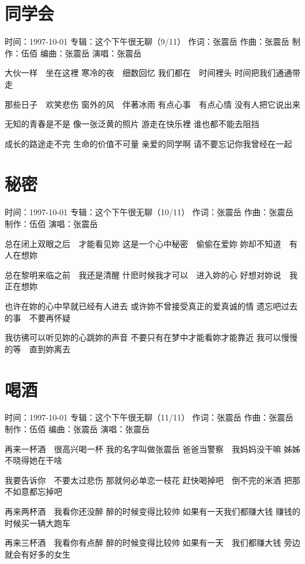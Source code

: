 \documentclass[UTF8,a4paper,oneside,twocolumn,12pt]{ctexbook}
\newcommand{\infopair}[2]{\textbullet #1：#2}
\newcommand{\zc}[1][伍佰]{\infopair{作词}{#1}}
\newcommand{\zq}[1][伍佰]{\infopair{作曲}{#1}}
\newcommand{\bq}[1][伍佰]{\infopair{编曲}{#1}}
\newcommand{\zj}[1]{\infopair{专辑}{#1}}
\newcommand{\zz}[1]{\infopair{制作}{#1}}
\newcommand{\sj}[1]{\infopair{时间}{#1}}
\newenvironment{info}{\begin{flushleft}\kaishu
	}
	{\end{flushleft}\normalsize\yahei\par}
\newenvironment{lyric}{
	}
{}
\begin{document}
\section{同学会}
\begin{info}
	\sj{1997-10-01}
	\zj{这个下午很无聊（9/11）}
	\zc[张震岳]
	\zq[张震岳]
	\zz{伍佰}
	\bq[张震岳]
	\infopair{演唱}{张震岳}
\end{info}
\begin{lyric}
	大伙一样　坐在这裡
	寒冷的夜　细数回忆
	我们都在　时间裡头
	时间把我们通通带走

	那些日子　欢笑悲伤
	窗外的风　伴著冰雨
	有点心事　有点心情
	没有人把它说出来

	无知的青春是不是
	像一张泛黄的照片
	游走在快乐裡
	谁也都不能去阻挡

	成长的路途走不完
	生命的价值不可量
	亲爱的同学啊
	请不要忘记你我曾经在一起
\end{lyric}

\section{秘密}
\begin{info}
	\sj{1997-10-01}
	\zj{这个下午很无聊（10/11）}
	\zc[张震岳]
	\zq[张震岳]
	\zz{伍佰}
	\infopair{演唱}{张震岳}
\end{info}
\begin{lyric}
	总在闭上双眼之后　才能看见妳
	这是一个心中秘密　偷偷在爱妳
	妳却不知道　有人在想妳

	总在黎明来临之前　我还是清醒
	什麽时候我才可以　进入妳的心
	好想对妳说　我正在想妳

	也许在妳的心中早就已经有人进去
	或许妳不曾接受真正的爱真诚的情
	遗忘吧过去的事　不要再怀疑

	我彷彿可以听见妳的心跳妳的声音
	不要只有在梦中才能看妳才能靠近
	我可以慢慢的等　直到妳离去
\end{lyric}

\section{喝酒}
\begin{info}
	\sj{1997-10-01}
	\zj{这个下午很无聊（11/11）}
	\zc[张震岳]
	\zq[张震岳]
	\zz{伍佰}
	\bq[张震岳]
	\infopair{演唱}{张震岳}
\end{info}
\begin{lyric}
	再来一杯酒　很高兴喝一杯
	我的名字叫做张震岳
	爸爸当警察　我妈妈没干嘛
	姊姊不晓得她在干啥

	我要告诉你　不要太过悲伤
	那就何必单恋一枝花
	赶快喝掉吧　倒不完的米酒
	把那不如意都忘掉吧

	再来两杯酒　我看你还没醉
	醉的时候变得比较帅
	如果有一天我们都赚大钱
	赚钱的时候买一辆大跑车

	再来三杯酒　我看你有点醉
	醉的时候变得比较帅
	如果有一天　我们都赚大钱
	旁边就会有好多的女生
\end{lyric}
\end{document}
